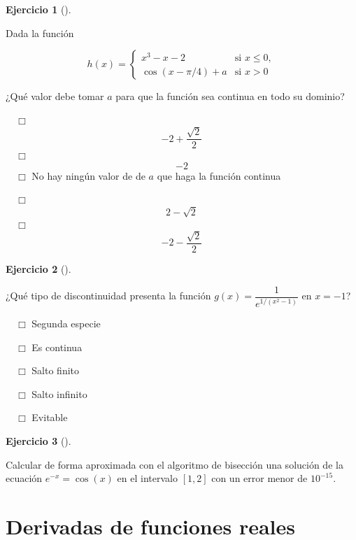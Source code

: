 \documentclass[
  a4paper,
]{scrreport}
\theoremstyle{definition}
\newtheorem{exercise}{Ejercicio}[chapter]
\theoremstyle{remark}
\begin{document}
\begin{exercise}[]\protect\hypertarget{exr-continuidad-2}{}\label{exr-continuidad-2}

Dada la función

\[
h(x)=
\begin{cases}
x^3-x-2 & \mbox{si } x\leq 0,\\
\cos(x-\pi/4)+a & \mbox{si } x>0
\end{cases}
\]

¿Qué valor debe tomar \(a\) para que la función sea continua en todo su
dominio?

${\quad\Box}$ $$-2+\frac{\sqrt{2}}{2}$$
${\quad\Box}$ $$-2$$
${\quad\Box}$ No hay ningún valor de de $a$ que haga la función continua

${\quad\Box}$ $$2-\sqrt{2}$$
${\quad\Box}$ $$-2 - \frac{\sqrt{2}}{2}$$

\end{exercise}

\begin{exercise}[]\protect\hypertarget{exr-clasificacion-discontinuidad}{}\label{exr-clasificacion-discontinuidad}

¿Qué tipo de discontinuidad presenta la función
\(g(x)=\dfrac{1}{e^{1/(x^2-1)}}\) en \(x=-1\)?

${\quad\Box}$ Segunda especie

${\quad\Box}$ Es continua

${\quad\Box}$ Salto finito

${\quad\Box}$ Salto infinito

${\quad\Box}$ Evitable

\end{exercise}

\begin{exercise}[]\protect\hypertarget{exr-raices}{}\label{exr-raices}

Calcular de forma aproximada con el algoritmo de bisección una solución
de la ecuación \(e^{-x}=\cos(x)\) en el intervalo \([1,2]\) con un error
menor de \(10^{-15}\).

\vspace{18pt}

\end{exercise}


\hypertarget{derivadas-de-funciones-reales}{%
\chapter{Derivadas de funciones
reales}\label{derivadas-de-funciones-reales}}
\end{document}
